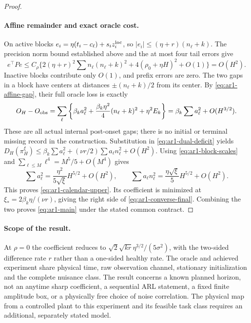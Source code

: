 \begin{proof}
\paragraph{Affine remainder and exact oracle cost.}
On active blocks $e_i=\eta(t_i-c_\ell)+s_i z_i^{\rm loc}$, so
$|e_i|\le(\eta+r)(n_\ell+k)$. The precision norm bound established above
and the at most four tail errors give
\[
 e^\top Pe\le C_\rho\{2(\eta+r)^2\sum n_\ell(n_\ell+k)^2
 +4(\rho_0+\eta H)^2+O(1)\}=O(H^2).
\]
Inactive blocks contribute only $O(1)$, and prefix errors are zero.
The two gaps in a block have centers at distances $\pm(n_\ell+k)/2$ from
its center. By \eqref{eq:ar1-affine-gap}, their full oracle loss is exactly
\[
 O_H-O_{\rm obs}=\sum_\ell\left\{\beta_k a_\ell^2
 +\frac{\beta_k\eta^2}{4}(n_\ell+k)^2+\eta^2E_k\right\}
 =\beta_k\sum a_\ell^2+O(H^{3/2}).
\]
These are all actual internal post-onset gaps; there is no initial or terminal
missing record in the construction.
Substitution in \eqref{eq:ar1-dual-deficit} yields
$D_H(\pi_H^\xi)\le\beta_k\sum a_\ell^2+(\nu r/2)\sum a_\ell n_\ell^2+O(H^2)$.
Using \eqref{eq:ar1-block-scales} and
$\sum_{\ell\le M}\ell^4=M^5/5+O(M^4)$ gives
\[
 \sum a_\ell^2=\frac{\eta^2}{5\sqrt\xi}H^{5/2}+O(H^2),\qquad
 \sum a_\ell n_\ell^2=\frac{\eta\sqrt\xi}{5}H^{5/2}+O(H^2).
\]
This proves \eqref{eq:ar1-calendar-upper}.
Its coefficient is minimized at $\xi_*=2\beta_k\eta/(\nu r)$, giving the
right side of \eqref{eq:ar1-converse-final}. Combining the two proves
\eqref{eq:ar1-main} under the stated common contract.
\end{proof}

\paragraph{Scope of the result.}
At $\rho=0$ the coefficient reduces to
$\sqrt2\sqrt{kr}\eta^{3/2}/(5\sigma^2)$, with the two-sided difference rate
$r$ rather than a one-sided healthy rate. The oracle and achieved experiment
share physical time, raw observation channel, stationary initialization and
the complete nuisance class. The result concerns a known planned horizon,
not an anytime sharp coefficient, a sequential ARL statement, a fixed finite
amplitude box, or a physically free choice of noise correlation.
The physical map from a controlled plant to this experiment and its feasible
task class requires an additional, separately stated model.
